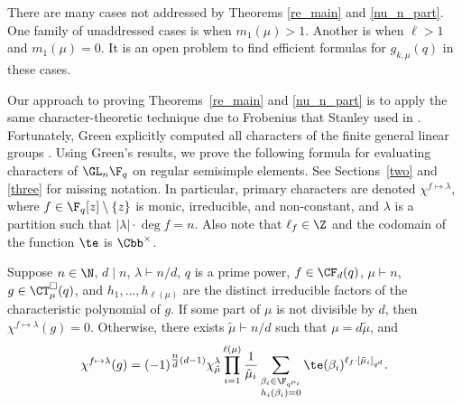 \begin{remark}
There are many cases not addressed by Theorems \ref{re_main} and \ref{nu_n_part}.
One family of unaddressed cases is when \(m_1(\mu) > 1\).
Another is when \(\ell > 1\) and \(m_1(\mu) = 0\).
It is an open problem to find efficient formulas for \(g_{k,\mu} (q)\) in these cases.
\end{remark}











Our approach to proving Theorems~\ref{re_main} and \ref{nu_n_part} is to apply the same character-theoretic technique due to Frobenius that Stanley used in \cite{ncycle}.
Fortunately, Green explicitly computed all characters of the finite general linear groups \cite{green}.
Using Green's results, we prove the following formula for evaluating  characters of \(\GL_n \F_q\) on regular semisimple elements.
See Sections~\ref{two} and \ref{three} for missing notation.
In particular,
primary characters are denoted \(\chi^{f \mapsto \lambda}\), where \(f \in \F_q [z] \setminus \{z\}\) is monic, irreducible, and non-constant, and \(\lambda\) is a partition such that \(|\lambda| \cdot \deg f = n\).
Also note that \(\ell_f \in \Z\) and the codomain of the function \(\te\) is \(\Cbb^\times\).

\begin{theorem} \label{main_lemma_in_intro}
Suppose \(n \in \N\), \(d \mid n\), \(\lambda \vdash n/d\), \(q\) is a prime power, \(f \in \CF_d (q)\), \(\mu \vdash n\), \(g \in \CT_\mu^\Box (q)\), and \(h_1,\ldots,h_{\ell(\mu)}\) are the distinct irreducible factors of the characteristic polynomial of \(g\).
If some part of \(\mu\) is not divisible by \(d\), then \(\chi^{f \mapsto \lambda} (g) = 0\).
Otherwise, there exists \(\tilde{\mu} \vdash n/d\) such that \(\mu = d \tilde{\mu}\), and
\begin{equation}
\chi^{f \mapsto \lambda} (g)
= (-1)^{\tfrac{n}{d}(d-1)}
\chi^\lambda_{\tilde{\mu}}
\prod_{i = 1}^{\ell(\mu)}
\frac{1}{\tilde{\mu}_i}
\sum_{\substack{ \beta_i \in \F_{q^{\mu_i}} \\ h_i(\beta_i) = 0}} \te (\beta_i)^{\ell_f \cdot [\tilde{\mu}_i]_{q^d}}.
\end{equation}
\end{theorem}




